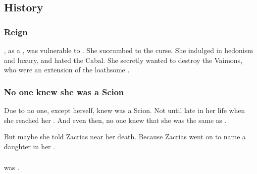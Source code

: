 \subsection{History}





\subsubsection{Reign}
\Belzir, as a \sathariah, was vulnerable to . 
She succumbed to the curse. 
She indulged in hedonism and luxury, and hated the Cabal. 
She secretly wanted to destroy the Vaimons, who were an extension of the loathsome \banes. 





\subsubsection{No one knew she was a Scion}
Due to  no one, except \Belzir{} herself, knew \Belzir{} was a Scion. 
Not until late in her life when she reached her \Apotheosis. 
And even then, no one knew that she was the same as \Delphine. 

But maybe she told Zacrias near her death. 
Because Zacrias went on to name a daughter \quo{\Delphine} in her \honour. 





\subsubsection{\Apotheosis}
\Belzir was . 





